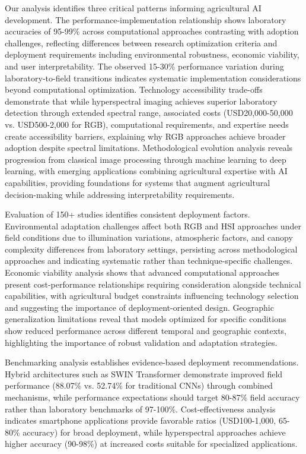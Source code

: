 \documentclass[sn-mathphys]{sn-jnl}
\theoremstyle{thmstyleone}%
\theoremstyle{thmstyletwo}%
\theoremstyle{thmstylethree}%
\begin{document}
Our analysis identifies three critical patterns informing agricultural AI development. The performance-implementation relationship shows laboratory accuracies of 95-99\% across computational approaches contrasting with adoption challenges, reflecting differences between research optimization criteria and deployment requirements including environmental robustness, economic viability, and user interpretability. The observed 15-30\% performance variation during laboratory-to-field transitions indicates systematic implementation considerations beyond computational optimization. Technology accessibility trade-offs demonstrate that while hyperspectral imaging achieves superior laboratory detection through extended spectral range, associated costs (USD20,000-50,000 vs. USD500-2,000 for RGB), computational requirements, and expertise needs create accessibility barriers, explaining why RGB approaches achieve broader adoption despite spectral limitations. Methodological evolution analysis reveals progression from classical image processing through machine learning to deep learning, with emerging applications combining agricultural expertise with AI capabilities, providing foundations for systems that augment agricultural decision-making while addressing interpretability requirements.


Evaluation of 150+ studies identifies consistent deployment factors. Environmental adaptation challenges affect both RGB and HSI approaches under field conditions due to illumination variations, atmospheric factors, and canopy complexity differences from laboratory settings, persisting across methodological approaches and indicating systematic rather than technique-specific challenges. Economic viability analysis shows that advanced computational approaches present cost-performance relationships requiring consideration alongside technical capabilities, with agricultural budget constraints influencing technology selection and suggesting the importance of deployment-oriented design. Geographic generalization limitations reveal that models optimized for specific conditions show reduced performance across different temporal and geographic contexts, highlighting the importance of robust validation and adaptation strategies.


Benchmarking analysis establishes evidence-based deployment recommendations. Hybrid architectures such as SWIN Transformer demonstrate improved field performance (88.07\% vs. 52.74\% for traditional CNNs) through combined mechanisms, while performance expectations should target 80-87\% field accuracy rather than laboratory benchmarks of 97-100\%. Cost-effectiveness analysis indicates smartphone applications provide favorable ratios (USD100-1,000, 65-80\% accuracy) for broad deployment, while hyperspectral approaches achieve higher accuracy (90-98\%) at increased costs suitable for specialized applications.
\end{document}

